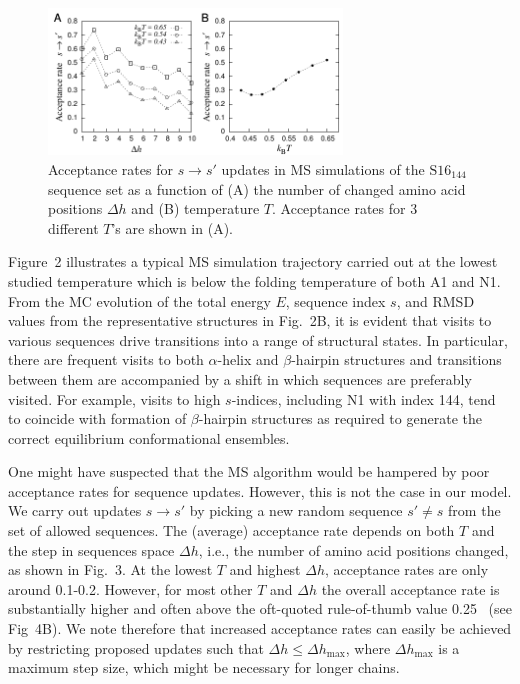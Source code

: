 \documentclass[
aip,
rsi,%
amsmath,amssymb,
reprint,%
]{revtex4-1}
\newcommand	 {\sbar}	{{s}}
\newcommand {\SR}		{${\mathrm{S16}_{144}}$}
\begin{document}
\begin{figure}
\includegraphics[width=7.8cm]{Pacc}
\caption{Acceptance rates for $\sbar\rightarrow\sbar'$ updates in MS simulations of the {\SR} sequence set as a function of (A) the number of changed amino acid positions $\Delta h$ and (B) temperature $T$. Acceptance rates for 3 different $T$'s are shown in (A).}
\end{figure}

Figure~2 illustrates a typical MS simulation trajectory carried out at the lowest studied temperature which is below the folding temperature of both A1 and N1.~\cite{Holzgrafe2014,Holzgrafe2015} From the MC evolution of the total energy $E$, sequence index $\sbar$, and RMSD values from the representative structures in Fig.~2B, it is evident that visits to various sequences drive transitions into a range of structural states. In particular, there are frequent visits to both $\alpha$-helix and $\beta$-hairpin structures and transitions between them are accompanied by a shift in which sequences are preferably visited. For example, visits to high $\sbar$-indices, including N1 with index 144, tend to coincide with formation of $\beta$-hairpin structures as required to generate the correct equilibrium conformational ensembles. 

One might have suspected that the MS algorithm would be hampered by poor acceptance rates for sequence updates. However, this is not the case in our model. We carry out updates $\sbar\rightarrow\sbar'$ by picking a new random sequence $\sbar'\ne\sbar$ from the set of allowed sequences. The (average) acceptance rate  depends on both $T$ and the step in sequences space $\Delta h$, i.e., the number of amino acid positions changed, as shown in Fig.~3. At the lowest $T$ and highest $\Delta h$, acceptance rates are only around 0.1-0.2. However, for most other $T$ and $\Delta h$ the overall acceptance rate is substantially higher and often above the oft-quoted rule-of-thumb value 0.25~\cite{Gilks1996} (see Fig~4B). We note therefore that increased acceptance rates can easily be achieved by restricting proposed updates such that $\Delta h\le\Delta h_\mathrm{max}$, where $\Delta h_\mathrm{max}$ is a maximum step size, which might be necessary for longer chains. 
\end{document}
